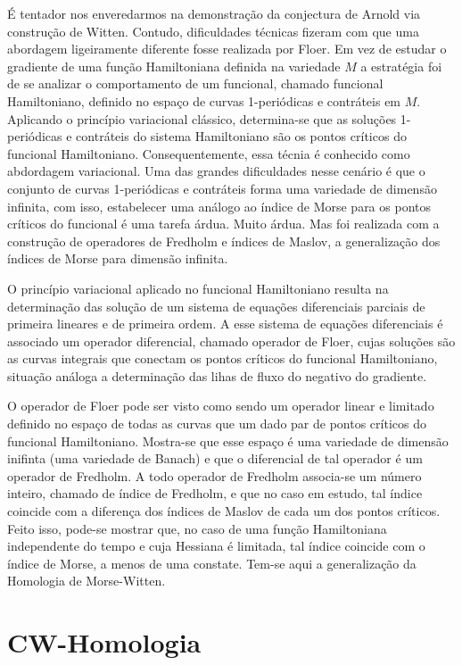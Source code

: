 \documentclass[12pt]{book}
\begin{document}
	É tentador nos enveredarmos na demonstração da conjectura de Arnold via construção de Witten. Contudo, dificuldades técnicas fizeram com que uma abordagem ligeiramente diferente fosse realizada por Floer. Em vez de estudar o gradiente de uma função Hamiltoniana definida na variedade $M$ a estratégia foi de se analizar o comportamento de um funcional, chamado funcional Hamiltoniano, definido no espaço de curvas 1-periódicas e contráteis em $M$. Aplicando o princípio variacional clássico, determina-se que as soluções 1-periódicas e contráteis do sistema Hamiltoniano são os pontos críticos do funcional Hamiltoniano. Consequentemente, essa técnia é conhecido como abdordagem variacional. Uma das grandes dificuldades nesse cenário é que o conjunto de curvas 1-periódicas e contráteis forma uma variedade de dimensão infinita, com isso, estabelecer uma análogo ao índice de Morse para os pontos críticos do funcional é uma tarefa árdua. Muito árdua. Mas foi realizada com a construção de operadores de Fredholm e índices de Maslov, a generalização dos índices de Morse para dimensão infinita.
	
	O princípio variacional aplicado no funcional Hamiltoniano resulta na determinação das solução de um sistema de equações diferenciais parciais de primeira lineares e de primeira ordem. A esse sistema de equações diferenciais é associado um operador diferencial, chamado operador de Floer, cujas soluções são as curvas integrais que conectam os pontos críticos do funcional Hamiltoniano, situação análoga a determinação das lihas de fluxo do negativo do gradiente.
	
	O operador de Floer pode ser visto como sendo um operador linear e limitado definido no espaço de todas as curvas que um dado par de pontos críticos do funcional Hamiltoniano. Mostra-se que esse espaço é uma variedade de dimensão inifinta (uma variedade de Banach) e que o diferencial de tal operador é um operador de Fredholm. A todo operador de Fredholm associa-se um número inteiro, chamado de índice de Fredholm, e que no caso em estudo, tal índice coincide com a diferença dos índices de Maslov de cada um dos pontos críticos. Feito isso, pode-se mostrar que, no caso de uma função Hamiltoniana independente do tempo e cuja Hessiana é limitada, tal índice coincide com o índice de Morse, a menos de uma constate. Tem-se aqui a generalização da Homologia de Morse-Witten.
	
	\chapter{CW-Homologia}
\end{document}

